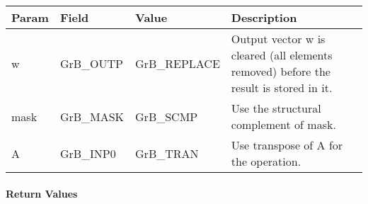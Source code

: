 \begin{itemize}[leftmargin=1.1in]
    \begin{tabular}{lllp{2.5in}}
        Param & Field  & Value & Description \\
        \hline
        {\sf w}    & {\sf GrB\_OUTP} & {\sf GrB\_REPLACE} & Output vector {\sf w}
        is cleared (all elements removed) before the result is stored in it.\\

        {\sf mask} & {\sf GrB\_MASK} & {\sf GrB\_SCMP}   & Use the structural
        complement of {\sf mask}. \\

        {\sf A}    & {\sf GrB\_INP0} & {\sf GrB\_TRAN}   & Use transpose of {\sf A}
        for the operation. \\
    \end{tabular}
\end{itemize}

\paragraph{Return Values}

